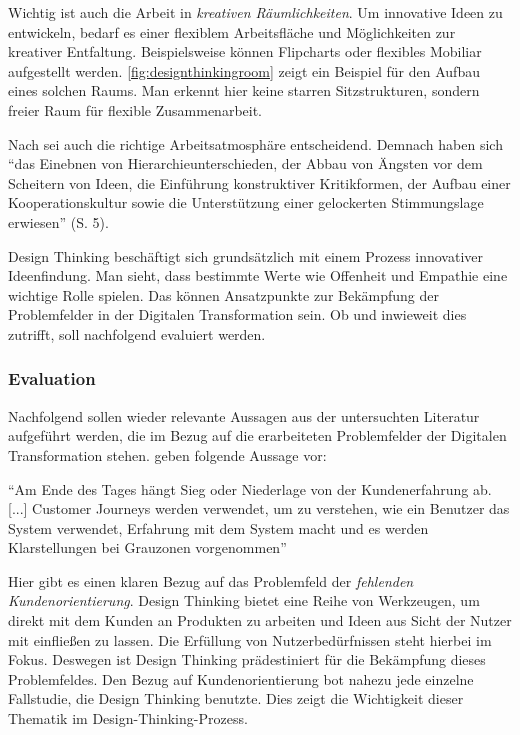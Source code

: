 Wichtig ist auch die Arbeit in \textit{kreativen Räumlichkeiten}. Um innovative Ideen zu entwickeln, bedarf es einer flexiblem Arbeitsfläche und Möglichkeiten zur kreativer Entfaltung. Beispielsweise können Flipcharts oder flexibles Mobiliar aufgestellt werden. \ref{fig:designthinkingroom} zeigt ein Beispiel für den Aufbau eines solchen Raums. Man erkennt hier keine starren Sitzstrukturen, sondern freier Raum für flexible Zusammenarbeit.

Nach  sei auch die richtige Arbeitsatmosphäre entscheidend. Demnach haben sich ``das Einebnen von Hierarchieunterschieden, der Abbau von Ängsten vor dem Scheitern von Ideen, die Einführung konstruktiver Kritikformen, der Aufbau einer Kooperationskultur sowie die Unterstützung einer gelockerten Stimmungslage erwiesen'' (S. 5).

Design Thinking beschäftigt sich grundsätzlich mit einem Prozess innovativer Ideenfindung. Man sieht, dass bestimmte Werte wie Offenheit und Empathie eine wichtige Rolle spielen. Das können Ansatzpunkte zur Bekämpfung der Problemfelder in der Digitalen Transformation sein. Ob und inwieweit dies zutrifft, soll nachfolgend evaluiert werden.

\subsubsection{Evaluation}

Nachfolgend sollen wieder relevante Aussagen aus der untersuchten Literatur aufgeführt werden, die im Bezug auf die erarbeiteten Problemfelder der Digitalen Transformation stehen.  geben folgende Aussage vor: 

\begin{center}
	``Am Ende des Tages hängt Sieg oder Niederlage von der Kundenerfahrung ab. [...] Customer Journeys werden verwendet, um zu verstehen, wie ein Benutzer das System verwendet, Erfahrung mit dem System macht und es werden Klarstellungen bei Grauzonen vorgenommen'' \cite[S. 3]{prasad_adopting_2018}
\end{center}

Hier gibt es einen klaren Bezug auf das Problemfeld der \textit{fehlenden Kundenorientierung}. Design Thinking bietet eine Reihe von Werkzeugen, um direkt mit dem Kunden an Produkten zu arbeiten und Ideen aus Sicht der Nutzer mit einfließen zu lassen. Die Erfüllung von Nutzerbedürfnissen steht hierbei im Fokus. Deswegen ist Design Thinking prädestiniert für die Bekämpfung dieses Problemfeldes. Den Bezug auf Kundenorientierung bot nahezu jede einzelne Fallstudie, die Design Thinking benutzte. Dies zeigt die Wichtigkeit dieser Thematik im Design-Thinking-Prozess.

